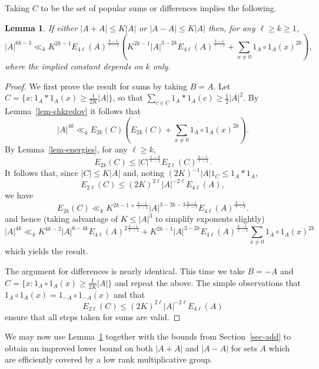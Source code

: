 \documentclass{amsart}
\renewcommand{\leq}{\leqslant}
\renewcommand{\geq}{\geqslant}
\newcommand{\abs}[1]{\left\lvert #1\right\rvert}
\newcommand{\brac}[1]{\left( #1\right)}
\newtheorem{lemma}{Lemma}
\theoremstyle{definition}
\begin{document}
Taking $C$ to be the set of popular sums or differences implies the following.
\begin{lemma}\label{lem-pop}
If either $\abs{A+A}\leq K\abs{A}$ or $\abs{A-A}\leq K\abs{A}$ then, for any $\ell\geq k\geq 1$,
\[\abs{A}^{6k-3}\ll_k K^{2k-1}E_{4\ell}(A)^{\frac{k-1}{\ell-1}}\brac{ K^{2k-1}\abs{A}^{3-2k}E_{4\ell}(A)^{\frac{k-1}{\ell-1}}+ \sum_{x\neq 0}1_A\circ 1_A(x)^{2k}},\]
where the implied constant depends on $k$ only.
\end{lemma}
\begin{proof}
We first prove the result for sums by taking $B=A$. Let $C=\{ x : 1_A\ast 1_A(x)\geq \frac{1}{2K}\abs{A}\}$, so that $\sum_{c\in C}1_A\ast 1_A(c) \geq \frac{1}{2}\abs{A}^2$. By Lemma~\ref{lem-shkredov} it follows that
\[\abs{A}^{4k}\ll_k E_{2k}(C)\brac{E_{2k}(C)+\sum_{x\neq 0} 1_A\circ 1_A(x)^{2k}}.\]
By Lemma~\ref{lem-energies}, for any $\ell \geq k$,
\[E_{2k}(C) \leq \abs{C}^{\frac{\ell-k}{\ell-1}}E_{2\ell}(C)^{\frac{k-1}{\ell-1}}.\]
It follows that, since $\abs{C}\leq K\abs{A}$ and, noting $(2K)^{-1}\abs{A}1_C\leq 1_A\ast 1_A$,
\[E_{2\ell}(C) \leq (2K)^{2\ell}\abs{A}^{-2\ell}E_{4\ell}(A),\]
we have
\[E_{2k}(C) \ll_k K^{2k-1+\frac{k-1}{\ell-1}}\abs{A}^{3-2k-3\frac{k-1}{\ell-1}}E_{4\ell}(A)^{\frac{k-1}{\ell-1}}.\]
and hence (taking advantage of $K\leq \abs{A}^3$ to simplify exponents slightly)
\[\abs{A}^{4k}\ll_k K^{4k-2}\abs{A}^{6-4k}E_{4\ell}(A)^{2\frac{k-1}{\ell-1}}+ K^{2k-1}\abs{A}^{3-2k}E_{4\ell}(A)^{\frac{k-1}{\ell-1}}\sum_{x\neq 0}1_A\circ 1_A(x)^{2k}\]
which yields the result.

The argument for differences is nearly identical. This time we take $B=-A$ and $C=\{ x : 1_A\circ 1_A(x)\geq \frac{1}{2K}\abs{A}\}$ and repeat the above. The simple observations that $1_A \circ 1_A(x) = 1_{-A} \circ 1_{-A}(x)$ and that 
\[ E_{2\ell}(C) \leq (2K)^{2\ell}\abs{A}^{-2\ell}E_{4\ell}(A)\]
ensure that all steps taken for sums are valid.
\end{proof}

We may now use Lemma~\ref{lem-pop} together with the bounds from Section~\ref{sec-add} to obtain an improved lower bound on both $\abs{A+A}$ and $\abs{A-A}$ for sets $A$ which are efficiently covered by a low rank multiplicative group.
\end{document}
